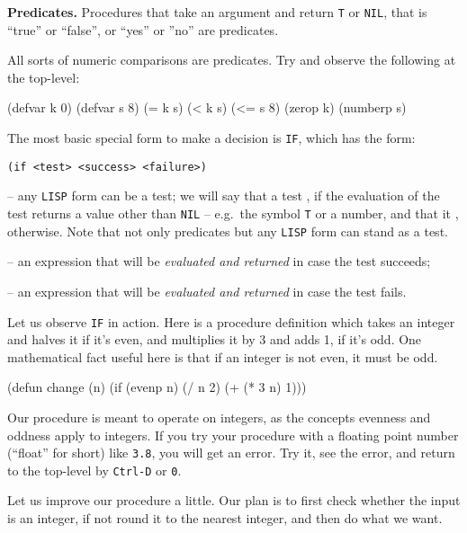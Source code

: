 \documentclass[a4paper,11pt]{article}
\begin{document}
\begin{uenum}
\item {\bf Predicates.} Procedures that take an argument and return \Verb+T+ or \Verb+NIL+, that is ``true'' or ``false'', or ``yes'' or ''no'' are predicates.
\begin{uenumi}
\item All sorts of numeric comparisons are predicates. Try and observe the following at the top-level:

\begin{lispcode}
(defvar k 0)
(defvar s 8)
(= k s)
(< k s)
(<= s 8)
(zerop k)
(numberp s)
\end{lispcode}

\end{uenumi}

\item The most basic special form to make a decision is \Verb+IF+, which has the form:

\begin{Verbatim}
(if <test> <success> <failure>)
\end{Verbatim}

\begin{uenumi}
\item {} -- any \Verb+LISP+ form can be a test; we will say that a test , if the evaluation of the test returns a value other than \Verb+NIL+ -- e.g.\ the symbol \Verb+T+ or a number, and that it , otherwise. Note that not only predicates but any \Verb+LISP+ form can stand as a test.
\item {} -- an expression that will be \emph{evaluated and returned} in case the test succeeds;
\item {} -- an expression that will be \emph{evaluated and returned} in case the test fails.
\end{uenumi}


\item Let us observe \Verb+IF+ in action. Here is a procedure definition which takes an integer and halves it if it's even, and multiplies it by 3 and adds 1, if it's odd. One mathematical fact useful here is that if an integer is not even, it must be odd.  

\begin{lispcode}
(defun change (n)
  (if (evenp n)
    (/ n 2)
    (+ (* 3 n) 1)))
\end{lispcode}

\begin{uenumi}
\item Our procedure is meant to operate on integers, as the concepts evenness and oddness apply to integers. If you try your procedure with a floating point number (``float'' for short) like \Verb+3.8+, you will get an error. Try it, see the error, and return to the top-level by \Verb+Ctrl-D+ or \Verb+0+.    
\item Let us improve our procedure a little. Our plan is to first check whether the input is an integer, if not round it to the nearest integer, and then do what we want. 


\end{uenumi}
\end{uenum}
\end{document}

